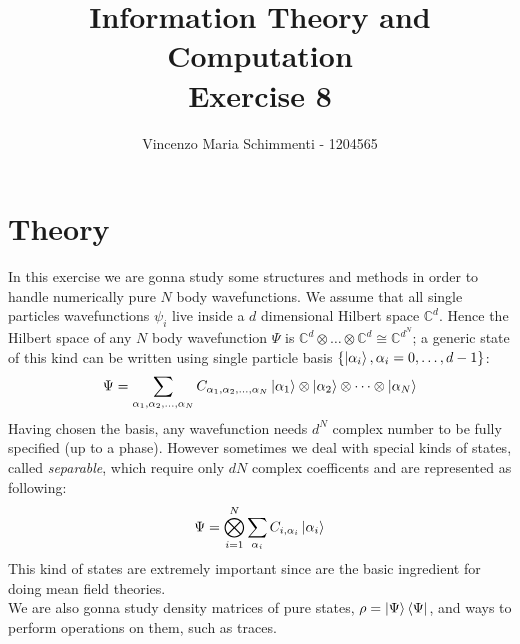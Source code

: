 \documentclass{article}
\title{%
	Information Theory and Computation \\
	Exercise  8}
\author{Vincenzo Maria Schimmenti - 1204565}
\begin{document}
\maketitle
 
\section*{Theory}
In this exercise we are gonna study some structures and methods in order to handle numerically pure $N$ body wavefunctions. We assume that all single particles wavefunctions $\psi_i$ live inside a $d$ dimensional Hilbert space $\mathbb{C}^d$. Hence the Hilbert space of any $N$ body wavefunction $\Psi$ is $\mathbb{C}^d \otimes \dots \otimes \mathbb{C}^d \cong \mathbb{C}^{d^N}$; a generic state of this kind can be written using single particle basis $\{ \ket{\alpha_i}, \alpha_i=0, \dots, d-1\}$:
\begin{equation}
	\Psi = \sum_{\alpha_1, \alpha_2, \dots, \alpha_N} C_{\alpha_1, \alpha_2, \dots, \alpha_N} \ket{\alpha_1} \otimes \ket{\alpha_2} \otimes \dots \otimes \ket{\alpha_N}
\end{equation}
Having chosen the basis, any wavefunction needs $d^N$ complex number to be fully specified (up to a phase). However sometimes we deal with special kinds of states, called \textit{separable}, which require only $dN$ complex coefficents and are represented as following:
\begin{equation}
	\Psi = \bigotimes_{i=1}^N \sum_{\alpha_i} C_{i, \alpha_i} \ket{\alpha_i}
\end{equation}
This kind of states are extremely important since are the basic ingredient for doing mean field theories. \\
We are also gonna study density matrices of pure states, $\rho=\ket{\Psi} \bra{\Psi}$, and ways to perform operations on them, such as traces.
\newpage
\end{document}
